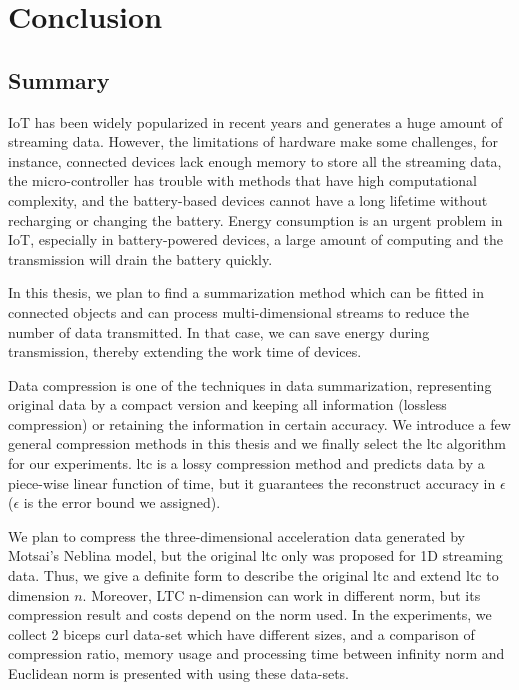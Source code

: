 \chapter{Conclusion}


\section{Summary}


IoT has been widely popularized in recent years and generates a huge amount of
streaming data. However, the limitations of hardware make some challenges, for
instance, connected devices lack enough memory to store all the streaming data,
the micro-controller has trouble with methods that have high computational
complexity, and the battery-based devices cannot have a long lifetime without
recharging or changing the battery. Energy consumption is an urgent problem in
IoT, especially in battery-powered devices, a large amount of computing and the
transmission will drain the battery quickly.

In this thesis, we plan to find a summarization method which can be fitted in
connected objects and can process multi-dimensional streams to reduce the number
of data transmitted. In that case, we can save energy during transmission,
thereby extending the work time of devices.

Data compression is one of the techniques in data summarization, representing
original data by a compact version and keeping all information (lossless
compression) or retaining the information in certain accuracy. We introduce a
few general compression methods in this thesis and we finally select the
\acrfull{ltc} algorithm for our experiments. \acrshort{ltc} is a lossy
compression method and predicts data by a piece-wise linear function of time,
but it guarantees the reconstruct accuracy in $\epsilon$ ($\epsilon$ is the
error bound we assigned). 

We plan to compress the three-dimensional acceleration data generated by
Motsai's Neblina model, but the original \acrshort{ltc} only was proposed for 1D
streaming data. Thus, we give a definite form to describe the original
\acrshort{ltc} and extend \acrshort{ltc} to dimension $n$. Moreover, LTC
n-dimension can work in different norm, but its compression result and costs
depend on the norm used. In the experiments, we collect 2 biceps curl data-set
which have different sizes, and a comparison of compression ratio, memory usage
and processing time between infinity norm and Euclidean norm is presented with
using these data-sets.

